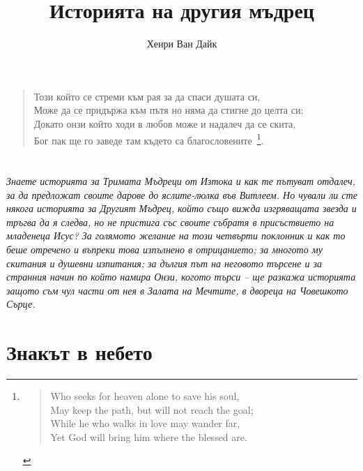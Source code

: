\documentclass[oneside,11pt]{memoir}
\title{Историята на другия мъдрец}
\author{Хенри Ван Дайк}
\begin{document}
\thispagestyle{empty}


\newpage

\begin{KeepFromToc}
  \tableofcontents
\end{KeepFromToc}

\chapter*{}

\begin{quote}
  \fontsize{8}{10}\selectfont
  Този който се стреми към рая за да спаси душата си, \\
  Може да се придържа към пътя но няма да стигне до целта си; \\
  Докато онзи който ходи в любов може и надалеч да се скита, \\
  Бог пак ще го заведе там където са благословените~\footnote{
  \begin{quote}
    Who seeks for heaven alone to save his soul, \\
    May keep the path, but will not reach the goal; \\
    While he who walks in love may wander far, \\
    Yet God will bring him where the blessed are.
  \end{quote}
  }.
\end{quote}

\newpage

\chapter*{}
\emph{\fontsize{9}{10}\selectfont
Знаете историята за Тримата Мъдреци от Изтока и как те пътуват отдалеч, за да
предложат своите дарове до яслите-люлка във Витлеем. Но чували ли сте някога
историята за Другият Мъдрец, който също вижда изгряващата звезда и тръгва да я
следва, но не пристига със своите събратя в присъствието на младенеца Исус? За
голямото желание на този четвърти поклонник и как то беше отречено и въпреки
това изпълнено в отрицанието; за многото му скитания и душевни изпитания; за
дългия път на неговото търсене и за странния начин по който намира Онзи, когото
търси -- ще разкажа историята защото съм чул части от нея в Залата на Мечтите, в
двореца на Човешкото Сърце.}

\newpage

\chapter{Знакът в небето}
\end{document}
